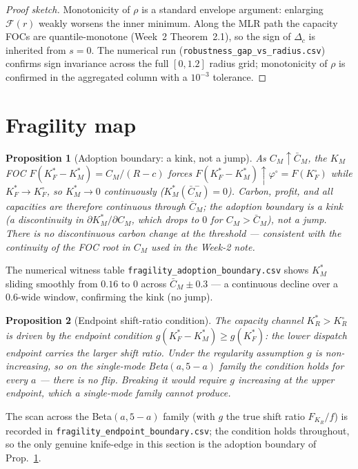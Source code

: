 \documentclass[11pt]{article}
\newtheorem{proposition}{Proposition}
\begin{document}
\begin{proof}[Proof sketch]
Monotonicity of $\rho$ is a standard envelope argument: enlarging
$\mathcal F(r)$ weakly worsens the inner minimum. Along the MLR path the
capacity FOCs are quantile-monotone (Week~2 Theorem~2.1), so the sign of
$\Delta_c$ is inherited from $s=0$. The numerical run
(\texttt{robustness\_gap\_vs\_radius.csv}) confirms sign invariance
across the full $[0,1.2]$ radius grid; monotonicity of $\rho$ is confirmed
in the aggregated column with a $10^{-3}$ tolerance.
\end{proof}

\section{Fragility map}
\begin{proposition}[Adoption boundary: a kink, not a jump]\label{prop:adoption}
As $C_M \uparrow \bar C_M$, the $K_M$ FOC $F(K_F^\ast-K_M^\ast)=C_M/(R-c)$ forces
$F(K_F^\ast-K_M^\ast)\uparrow\varphi^{\circ}=F(K_F^{\circ})$ while $K_F^\ast\to K_F^{\circ}$,
so $K_M^\ast\to 0$ \emph{continuously} ($K_M^\ast(\bar C_M^-)=0$). Carbon, profit, and all
capacities are therefore \emph{continuous} through $\bar C_M$; the adoption boundary is a
\emph{kink} (a discontinuity in $\partial K_M^\ast/\partial C_M$, which drops to $0$ for
$C_M>\bar C_M$), not a jump. There is no discontinuous carbon change at the threshold ---
consistent with the continuity of the FOC root in $C_M$ used in the Week-2 note.
\end{proposition}

The numerical witness table \texttt{fragility\_adoption\_boundary.csv}
shows $K_M^\ast$ sliding smoothly from $0.16$ to $0$ across $\bar C_M \pm 0.3$ ---
a continuous decline over a $0.6$-wide window, confirming the kink (no jump).

\begin{proposition}[Endpoint shift-ratio condition]\label{prop:endpoint}
The capacity channel $K_R^\ast > K_R^\circ$ is driven by the endpoint
condition $g(K_F^\ast - K_M^\ast) \ge g(K_F^\ast)$: the lower dispatch
endpoint carries the larger shift ratio. Under the regularity assumption
$g$ is non-increasing, so on the single-mode Beta$(a,5-a)$ family the
condition holds for \emph{every} $a$ --- there is no flip. Breaking it
would require $g$ increasing at the upper endpoint, which a single-mode
family cannot produce.
\end{proposition}

The scan across the Beta$(a,5-a)$ family (with $g$ the true shift ratio
$F_{K_R}/f$) is recorded in \texttt{fragility\_endpoint\_boundary.csv};
the condition holds throughout, so the only genuine knife-edge in this
section is the adoption boundary of Prop.~\ref{prop:adoption}.
\end{document}
